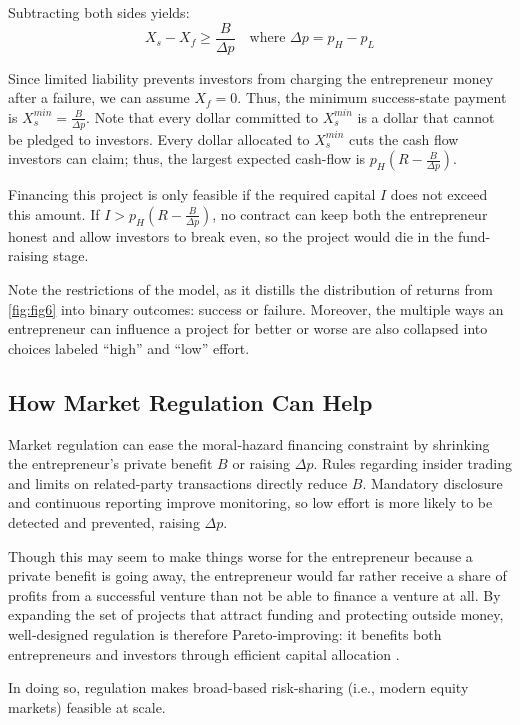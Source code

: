 Subtracting both sides yields:
\[
X_s - X_f \geq \frac{B}{\Delta p}
\quad \text{where } \Delta p = p_H - p_L
\]


Since limited liability prevents investors from charging the entrepreneur money after a failure, we can assume $X_f = 0$. Thus, the minimum success-state payment is $X_s^{min} = \frac{B}{\Delta p}$. Note that every dollar committed to $X_s^{min}$ is a dollar that cannot be pledged to investors. Every dollar allocated to $X_s^{min}$ cuts the cash flow investors can claim; thus, the largest expected cash-flow is $p_H(R- \frac{B}{\Delta p})$.

Financing this project is only feasible if the required capital $I$ does not exceed this amount. If $I> p_H(R- \frac{B}{\Delta p})$, no contract can keep both the entrepreneur honest and allow investors to break even, so the project would die in the fund-raising stage.

Note the restrictions of the model, as it distills the distribution of returns from \autoref{fig:fig6} into binary outcomes: success or failure. Moreover, the multiple ways an entrepreneur can influence a project for better or worse are also collapsed into choices labeled “high” and “low” effort.


\subsection{How Market Regulation Can Help}
Market regulation can ease the moral‑hazard financing constraint by shrinking the entrepreneur’s private benefit $B$ or raising $\Delta p$. Rules regarding insider trading and limits on related-party transactions directly reduce $B$. Mandatory disclosure and continuous reporting improve monitoring, so low effort is more likely to be detected and prevented, raising $\Delta p$. 

Though this may seem to make things worse for the entrepreneur because a private benefit is going away, the entrepreneur would far rather receive a share of profits from a successful venture than not be able to finance a venture at all. By expanding the set of projects that attract funding and protecting outside money, well‑designed regulation is therefore Pareto‑improving: it benefits both entrepreneurs and investors through efficient capital allocation \citep{holmstrom2011inside}.

In doing so, regulation makes broad-based risk-sharing (i.e., modern equity markets) feasible at scale.